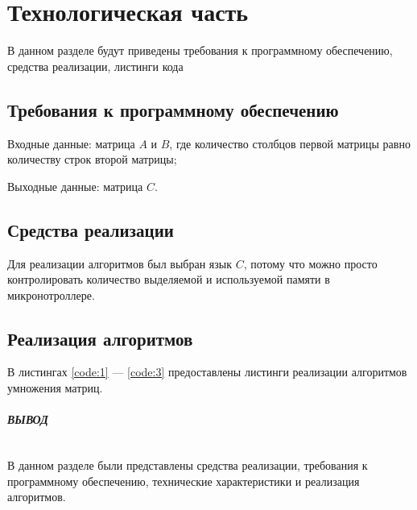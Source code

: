 \chapter{Технологическая часть}
В данном разделе будут приведены требования к программному обеспечению,
средства реализации, листинги кода




\section{Требования к программному обеспечению}

Входные данные: матрица $A$ и  $B$, где количество столбцов первой матрицы равно количеству
строк второй матрицы;

Выходные данные: матрица $C$.




\section{Средства реализации}

Для реализации алгоритмов был выбран язык $C$, потому что
можно просто контролировать количество выделяемой и используемой памяти
в микронотроллере.

\section{Реализация алгоритмов}

В листингах \ref{code:1} --- \ref{code:3} предоставлены листинги реализации
алгоритмов умножения матриц.

\begin{center}
\captionsetup{justification=raggedright,singlelinecheck=off}

\end{center}



\begin{center}
\captionsetup{justification=raggedright,singlelinecheck=off}

\end{center}


\begin{center}
\captionsetup{justification=raggedright,singlelinecheck=off}

\end{center}

\clearpage

\paragraph*{ВЫВОД} ${}$ \newline

В данном разделе были представлены средства реализации, требования к программному обеспечению,
технические характеристики и реализация алгоритмов.


